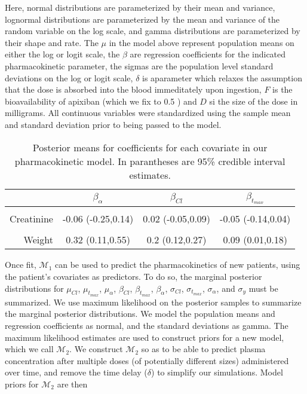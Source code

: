 Here, normal distributions are parameterized by their mean and variance, lognormal distributions are parameterized by the mean and variance of the random variable on the log scale, and gamma distributions are parameterized by their shape and rate.  The $\mu$ in the model above represent population means on either the log or logit scale, the $\beta$ are regression coefficients for the indicated pharmacokinetic parameter, the sigmas are the population level standard deviations on the log or logit scale, $\delta$ is aparameter which relaxes the assumption that the dose is absorbed into the blood immeditately upon ingestion, $F$ is the bioavailability of apixiban (which we fix to 0.5 \cite{byon2019apixaban}) and $D$ si the size of the dose in milligrams.  All continuous variables were standardized using the sample mean and standard deviation prior to being passed to the model. 



\begin{table}\label{tab:coefs}
	\centering
	\begin{tabular}[t]{rccc}
		\toprule
		& $\beta_\alpha$ & $\beta_{Cl}$ & $\beta_{t_{max}}$\\
		\midrule
		\cellcolor{gray!6}{Age} & \cellcolor{gray!6}{-0.08 (-0.27,0.1)} & \cellcolor{gray!6}{0.01 (-0.06,0.08)} & \cellcolor{gray!6}{-0.01 (-0.1,0.08)}\\
		Creatinine & -0.06 (-0.25,0.14) & 0.02 (-0.05,0.09) & -0.05 (-0.14,0.04)\\
		\cellcolor{gray!6}{Sex} & \cellcolor{gray!6}{-0.2 (-0.53,0.15)} & \cellcolor{gray!6}{0.39 (0.23,0.54)} & \cellcolor{gray!6}{-0.01 (-0.18,0.15)}\\
		Weight & 0.32 (0.11,0.55) & 0.2 (0.12,0.27) & 0.09 (0.01,0.18)\\
		\bottomrule
	\end{tabular}
	\caption{Posterior means for coefficients for each covariate in our pharmacokinetic model.  In parantheses are 95\% credible interval estimates.}
\end{table}


Once fit, $ \mathcal{M}_1$ can be used to predict the pharmacokinetics of new patients, using the patient’s covariates as predictors.  To do so, the marginal posterior distributions for $ \mu_{Cl} $, $ \mu_{t_{max}} $, $ \mu_{\alpha}$, $ \beta_{Cl} $, $ \beta_{t_{max}} $, $ \beta_{\alpha} $, $ \sigma_{Cl} $, $ \sigma_{t_{max}} $, $ \sigma_{\alpha} $, and $ \sigma_y $ must be summarized.  We use maximum likelihood on the posterior samples to summarize the marginal posterior distributions. We model the population means  and regression coefficients as normal, and the standard deviations  as gamma.  The maximum likelihood estimates are used to construct priors for a new model, which we call $ \mathcal{M}_2 $. We construct $ \mathcal{M}_2 $ so as to be able to predict plasma concentration after multiple doses (of potentially different sizes) administered over time, and remove the time delay ($ \delta $) to simplify our simulations.  Model priors for $ \mathcal{M}_2 $ are then 


